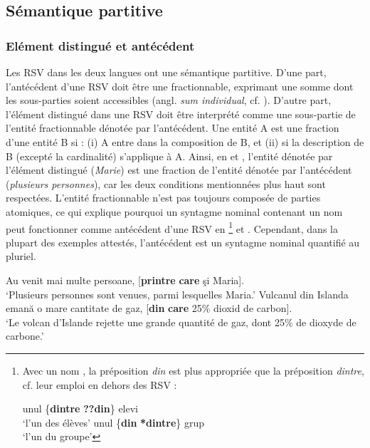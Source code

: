 \subsection{Sémantique partitive}\label{ch3:sect3.3.2}
\subsubsection{Elément distingué et antécédent}\label{ch3:sect3.3.2.1}

Les RSV dans les deux langues ont une sémantique partitive. D’une part, l’antécédent d’une RSV doit être une  fractionnable, exprimant une somme dont les sous-parties soient accessibles (angl. \textit{sum individual}, cf. \citealt{Lasersohn1995}). D’autre part, l’élément distingué dans une RSV doit être interprété comme une sous-partie de l’entité fractionnable dénotée par l’antécédent. Une entité A est une fraction d’une entité B si : (i) A entre dans la composition de B, et (ii) si la description de B (excepté la cardinalité) s’applique à A. Ainsi, en  et , l’entité dénotée par l’élément distingué (\textit{Marie}) est une fraction de l’entité dénotée par l’antécédent (\textit{plusieurs personnes}), car les deux conditions mentionnées plus haut sont respectées. L’entité fractionnable n’est pas toujours composée de parties atomiques, ce qui explique pourquoi un syntagme nominal contenant un nom  peut fonctionner comme antécédent d’une RSV en \footnote{\label{ch3:fn11} Avec un nom , la préposition \textit{din} est plus appropriée que la préposition \textit{dintre}, cf. leur emploi en dehors des RSV :

\ea 
unul \{\textbf{dintre} {\textbar} \textbf{??din}\} elevi\\
\glt ‘l’un des élèves’
\z 
\ea
unul \{\textbf{din} {\textbar} \textbf{*dintre}\} grup\\
\glt ‘l’un du groupe’
\zlast 
} et . Cependant, dans la plupart des exemples attestés, l’antécédent est un syntagme nominal quantifié au pluriel.

\ea \label{ch3:ex56}
\ea
Au venit mai multe persoane, [\textbf{printre} \textbf{care} şi Maria]. \label{ch3:ex56a}\\
\glt ‘Plusieurs personnes sont venues, parmi lesquelles Maria.’
\ex 
Vulcanul din Islanda emană o mare cantitate de gaz, [\textbf{din} \textbf{care} 25\% dioxid de carbon]. \label{ch3:ex56b}\\
\glt ‘Le volcan d’Islande rejette une grande quantité de gaz, dont 25\% de dioxyde de carbone.’ 
\z 
\z


